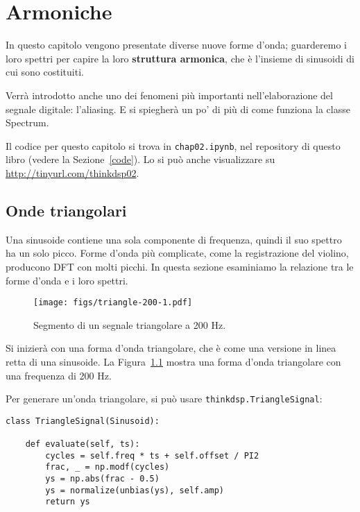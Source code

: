 \documentclass[12pt,a4paper]{book}
\begin{document}
\chapter{Armoniche} \label{harmonics} 

In questo capitolo vengono presentate diverse nuove forme d'onda; guarderemo i loro spettri per capire la loro {\bf struttura armonica}, che è l'insieme di sinusoidi di cui sono costituiti.

Verrà introdotto anche uno dei fenomeni più importanti nell'elaborazione del segnale digitale: l'aliasing. E si spiegherà un po' di più di come funziona la classe Spectrum.

Il codice per questo capitolo si trova in {\tt chap02.ipynb}, nel repository di questo libro (vedere la Sezione~\ref{code}). Lo si può anche visualizzare su \url{http://tinyurl.com/thinkdsp02}.

\section{Onde triangolari} \label{triangle} 

Una sinusoide contiene una sola componente di frequenza, quindi il suo spettro ha un solo picco. Forme d'onda più complicate, come la registrazione del violino, producono DFT con molti picchi. In questa sezione esaminiamo la relazione tra le forme d'onda e i loro spettri.

\begin{figure} 

\centerline{\texttt{[image: figs/triangle-200-1.pdf]}} \caption{Segmento di un segnale triangolare a 200 Hz.} \label{fig.triangle.200.1} \end{figure} 

Si inizierà con una forma d'onda triangolare, che è come una versione in linea retta di una sinusoide. La Figura~\ref{fig.triangle.200.1} mostra una forma d'onda triangolare con una frequenza di 200 Hz.

Per generare un'onda triangolare, si può usare {\tt thinkdsp.TriangleSignal}:

\begin{verbatim} 
class TriangleSignal(Sinusoid):

    def evaluate(self, ts):
        cycles = self.freq * ts + self.offset / PI2
        frac, _ = np.modf(cycles)
        ys = np.abs(frac - 0.5)
        ys = normalize(unbias(ys), self.amp)
        return ys
 \end{verbatim} 
\end{document}
